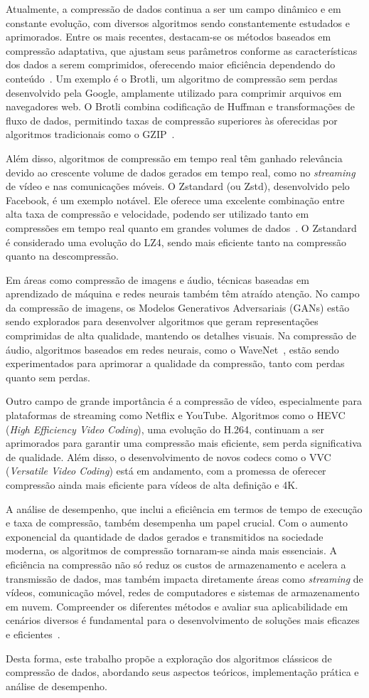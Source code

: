 Atualmente, a compressão de dados continua a ser um campo dinâmico e em constante evolução, com diversos algoritmos sendo constantemente estudados e aprimorados. Entre os mais recentes, destacam-se os métodos baseados em compressão adaptativa, que ajustam seus parâmetros conforme as características dos dados a serem comprimidos, oferecendo maior eficiência dependendo do conteúdo~\cite{salomon2007data}. Um exemplo é o Brotli, um algoritmo de compressão sem perdas desenvolvido pela Google, amplamente utilizado para comprimir arquivos em navegadores web. O Brotli combina codificação de Huffman e transformações de fluxo de dados, permitindo taxas de compressão superiores às oferecidas por algoritmos tradicionais como o GZIP~\cite{alakuijala2016brotli}.  

Além disso, algoritmos de compressão em tempo real têm ganhado relevância devido ao crescente volume de dados gerados em tempo real, como no \textit{streaming} de vídeo e nas comunicações móveis. O Zstandard (ou Zstd), desenvolvido pelo Facebook, é um exemplo notável. Ele oferece uma excelente combinação entre alta taxa de compressão e velocidade, podendo ser utilizado tanto em compressões em tempo real quanto em grandes volumes de dados~\cite{collet2016zstandard}. O Zstandard é considerado uma evolução do LZ4, sendo mais eficiente tanto na compressão quanto na descompressão.  

Em áreas como compressão de imagens e áudio, técnicas baseadas em aprendizado de máquina e redes neurais também têm atraído atenção. No campo da compressão de imagens, os Modelos Generativos Adversariais (GANs) estão sendo explorados para desenvolver algoritmos que geram representações comprimidas de alta qualidade, mantendo os detalhes visuais. Na compressão de áudio, algoritmos baseados em redes neurais, como o WaveNet~\cite{wavenet}, estão sendo experimentados para aprimorar a qualidade da compressão, tanto com perdas quanto sem perdas.  

Outro campo de grande importância é a compressão de vídeo, especialmente para plataformas de streaming como Netflix e YouTube. Algoritmos como o HEVC (\textit{High Efficiency Video Coding}), uma evolução do H.264, continuam a ser aprimorados para garantir uma compressão mais eficiente, sem perda significativa de qualidade. Além disso, o desenvolvimento de novos codecs como o VVC (\textit{Versatile Video Coding}) está em andamento, com a promessa de oferecer compressão ainda mais eficiente para vídeos de alta definição e 4K.  

A análise de desempenho, que inclui a eficiência em termos de tempo de execução e taxa de compressão, também desempenha um papel crucial. Com o aumento exponencial da quantidade de dados gerados e transmitidos na sociedade moderna, os algoritmos de compressão tornaram-se ainda mais essenciais. A eficiência na compressão não só reduz os custos de armazenamento e acelera a transmissão de dados, mas também impacta diretamente áreas como \textit{streaming} de vídeos, comunicação móvel, redes de computadores e sistemas de armazenamento em nuvem. Compreender os diferentes métodos e avaliar sua aplicabilidade em cenários diversos é fundamental para o desenvolvimento de soluções mais eficazes e eficientes~\cite{salomon2007data}.

Desta forma, este trabalho propõe a exploração dos algoritmos clássicos de compressão de dados, abordando seus aspectos teóricos, implementação prática e análise de desempenho.
